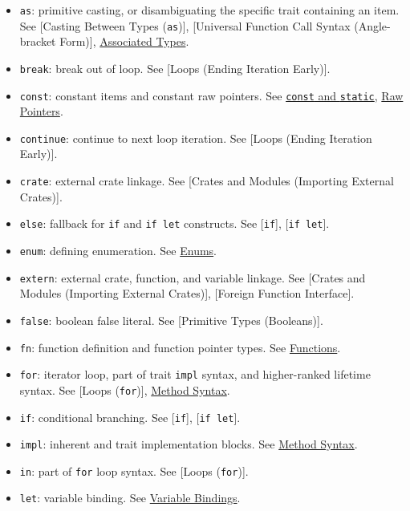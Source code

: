 \documentclass[a4paper,]{book}
\providecommand{\tightlist}{%
  \setlength{\itemsep}{0pt}\setlength{\parskip}{0pt}}
\begin{document}
\begin{itemize}
\tightlist
\item
  \texttt{as}: primitive casting, or disambiguating the specific trait
  containing an item. See {[}Casting Between Types (\texttt{as}){]},
  {[}Universal Function Call Syntax (Angle-bracket Form){]},
  \protect\hyperlink{sec--associated-types}{Associated Types}.
\item
  \texttt{break}: break out of loop. See {[}Loops (Ending Iteration
  Early){]}.
\item
  \texttt{const}: constant items and constant raw pointers. See
  \protect\hyperlink{sec--const-and-static}{\texttt{const} and
  \texttt{static}}, \protect\hyperlink{sec--raw-pointers}{Raw Pointers}.
\item
  \texttt{continue}: continue to next loop iteration. See {[}Loops
  (Ending Iteration Early){]}.
\item
  \texttt{crate}: external crate linkage. See {[}Crates and Modules
  (Importing External Crates){]}.
\item
  \texttt{else}: fallback for \texttt{if} and \texttt{if\ let}
  constructs. See {[}\texttt{if}{]}, {[}\texttt{if\ let}{]}.
\item
  \texttt{enum}: defining enumeration. See
  \protect\hyperlink{sec--enums}{Enums}.
\item
  \texttt{extern}: external crate, function, and variable linkage. See
  {[}Crates and Modules (Importing External Crates){]}, {[}Foreign
  Function Interface{]}.
\item
  \texttt{false}: boolean false literal. See {[}Primitive Types
  (Booleans){]}.
\item
  \texttt{fn}: function definition and function pointer types. See
  \protect\hyperlink{functions}{Functions}.
\item
  \texttt{for}: iterator loop, part of trait \texttt{impl} syntax, and
  higher-ranked lifetime syntax. See {[}Loops (\texttt{for}){]},
  \protect\hyperlink{sec--method-syntax}{Method Syntax}.
\item
  \texttt{if}: conditional branching. See {[}\texttt{if}{]},
  {[}\texttt{if\ let}{]}.
\item
  \texttt{impl}: inherent and trait implementation blocks. See
  \protect\hyperlink{sec--method-syntax}{Method Syntax}.
\item
  \texttt{in}: part of \texttt{for} loop syntax. See {[}Loops
  (\texttt{for}){]}.
\item
  \texttt{let}: variable binding. See
  \protect\hyperlink{sec--variable-bindings}{Variable Bindings}.

\end{itemize}
\end{document}

